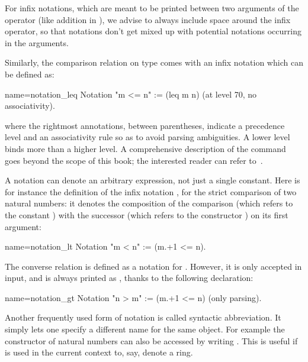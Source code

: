 For infix notations, which are meant to be printed between two arguments
of the operator (like addition in ), we advise to always include
space around the infix operator, so that notations don't get mixed up with
potential notations occurring in the arguments.


Similarly, the comparison relation  on type  comes with
an infix notation \C{<=} which can be defined as:

\begin{coq}{name=notation_leq}{}
Notation "m <= n" := (leq m n) (at level 70, no associativity).
\end{coq}

where the rightmost annotations, between parentheses, indicate a
precedence level and an associativity rule so as to avoid parsing
ambiguities. A lower level binds more than a higher level. A comprehensive
description of the  command goes beyond the scope of this
book; the interested reader can refer to~\cite[chapter 6.1, ``Syntax extensions and interpretation scopes'']{Coq:manual}.

A notation can denote an arbitrary expression, not just a
single constant. Here is for instance the definition of the infix
notation \C{<}, for the strict comparison of two natural numbers: it
denotes the composition of the comparison \C{_ <= _}
(which refers to the constant ) with the successor 
(which refers to the constructor ) on its first argument:

\begin{coq}{name=notation_lt}{}
Notation "m < n"  := (m.+1 <= n).
\end{coq}


The converse relation  is defined as a notation for
. However, it is only accepted in input,
and is always printed as  , thanks to the following declaration:

\begin{coq}{name=notation_gt}{}
Notation "n > m"  := (m.+1 <= n) (only parsing).
\end{coq}

Another frequently used form of notation is called syntactic abbreviation.
It simply lets one specify a different name for the same object.
For example the  constructor of natural numbers can also be accessed
by writing .  This is useful if  is used in the current context
to, say, denote a ring.

